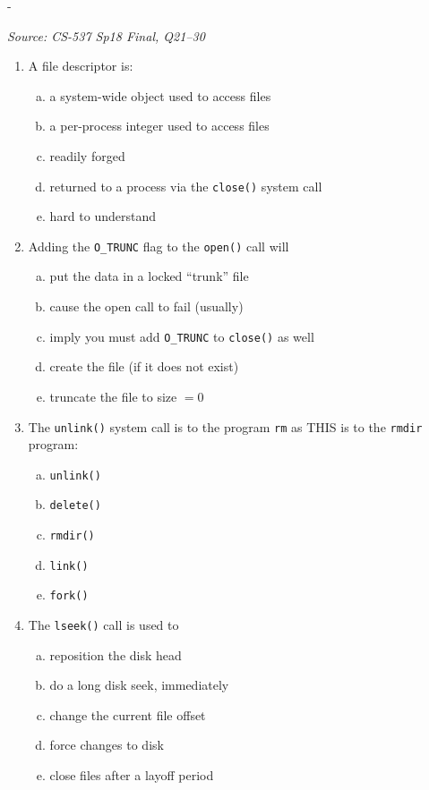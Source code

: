 \documentclass[11pt,a4paper]{article}
\makeatletter
\newcommand{\keepspace}[1]{\par\penalty-100\begingroup
  \setlength{\dimen@}{#1}\dimen@ii\pagegoal\advance\dimen@ii-\pagetotal
  \ifdim\dimen@>\dimen@ii\ifdim\dimen@ii>\z@\vfil\fi\break\fi\endgroup}
\newcounter{qn}[section]
\newenvironment{Qn}[4]{%
  \refstepcounter{qn}\keepspace{7\baselineskip}%
  \begin{tcolorbox}[qboxstyle, title={Q\thesection.\theqn\ \ [#1 \textbar\ #2]\ \ #4}]%
  {\footnotesize\color{g3}\textit{Source: #3}}\par\smallskip%
}{%
  \end{tcolorbox}%
}
\makeatother
\begin{document}
\begin{Qn}{Easy-Medium}{Lect 23}{CS-537 Sp18 Final, Q21--30}{File descriptors, \texttt{open}/\texttt{unlink}/\texttt{lseek}/\texttt{fsync}/\texttt{rename}}
\begin{enumerate}[(21)]
\item A file descriptor is:
\begin{enumerate}[(a)]
\item a system-wide object used to access files
\item a per-process integer used to access files
\item readily forged
\item returned to a process via the \texttt{close()} system call
\item hard to understand
\end{enumerate}
\item Adding the \texttt{O\_TRUNC} flag to the \texttt{open()} call will
\begin{enumerate}[(a)]
\item put the data in a locked ``trunk'' file
\item cause the open call to fail (usually)
\item imply you must add \texttt{O\_TRUNC} to \texttt{close()} as well
\item create the file (if it does not exist)
\item truncate the file to size $=0$
\end{enumerate}
\item The \texttt{unlink()} system call is to the program \texttt{rm} as
      THIS is to the \texttt{rmdir} program:
\begin{enumerate}[(a)]
\item \texttt{unlink()}
\item \texttt{delete()}
\item \texttt{rmdir()}
\item \texttt{link()}
\item \texttt{fork()}
\end{enumerate}
\item The \texttt{lseek()} call is used to
\begin{enumerate}[(a)]
\item reposition the disk head
\item do a long disk seek, immediately
\item change the current file offset
\item force changes to disk
\item close files after a layoff period

\end{enumerate}
\end{enumerate}
\end{Qn}
\end{document}
